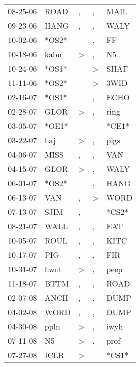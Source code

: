 \begin{supertabular}{lllll}
 08-25-06 &   ROAD &                , &             , &   MAIL \\
 09-23-06 &   HANG &                , &             , &   WALY \\
 10-02-06 &  *OS2* &                  &             , &     FF \\
 10-18-06 &   kabu &     \textgreater &             , &     N5 \\
 10-24-06 &  *OS1* &                  &  \textgreater &   SHAF \\
 11-11-06 &  *OS2* &                  &  \textgreater &   3WID \\
 02-16-07 &  *OS1* &                  &             , &   ECHO \\
 02-28-07 &   GLOR &     \textgreater &             , &   ring \\
 03-05-07 &  *OE1* &                  &               &  *CE1* \\
 03-22-07 &    haj &     \textgreater &             , &   pigs \\
 04-06-07 &   MISS &                , &             , &    VAN \\
 04-15-07 &   GLOR &     \textgreater &             , &   WALY \\
 06-01-07 &  *OS2* &                  &             , &   HANG \\
 06-13-07 &    VAN &                , &  \textgreater &   WORD \\
 07-13-07 &   SJIM &                , &               &  *CS2* \\
 08-21-07 &   WALL &                , &             , &    EAT \\
 10-05-07 &   ROUL &                , &             , &   KITC \\
 10-17-07 &    PIG &                , &             , &    FIR \\
 10-31-07 &   hwnt &     \textgreater &             , &   peep \\
 11-18-07 &   BTTM &                , &             , &   ROAD \\
 02-07-08 &   ANCH &                , &             , &   DUMP \\
 04-02-08 &   WORD &                , &             , &   DUMP \\
 04-30-08 &   ppln &     \textgreater &             , &   iwyh \\
 07-11-08 &     N5 &     \textgreater &             , &   prof \\
 07-27-08 &   ICLR &     \textgreater &               &  *CS1* \\

\end{supertabular}

